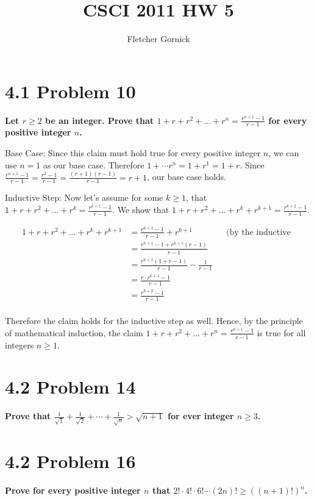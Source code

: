 \documentclass[10pt]{article}
\title{CSCI 2011 HW 5}
\author{Fletcher Gornick}
\def \n {\par \vspace{\baselineskip}}
\begin{document}
\maketitle

\section{4.1 Problem 10}
\textbf{Let $r \geq 2$ be an integer.  Prove that $1 + r + r^2 + ... + r^n = \frac{r^{n+1} - 1}{r - 1}$ for every positive integer $n$.}

\n
Base Case: Since this claim must hold true for every positive integer $n$, we can use $n = 1$ as our base case.  
Therefore $1 + \cdots r^n = 1 + r^1 = 1 + r$.  Since $\frac{r^{n+1} - 1}{r - 1} = \frac{r^2 - 1}{r - 1} = \frac{(r+1)(r-1)}{r-1} = r + 1$,
our base case holds.

\n
Inductive Step: Now let's assume for some $k \geq 1$, that $1 + r + r^2 + ... + r^k = \frac{r^{k+1} - 1}{r - 1}$.  We show that
$1 + r + r^2 + ... + r^k + r^{k+1} = \frac{r^{k+2} - 1}{r - 1}$.

\begin{align*}
    && 1 + r + r^2 + ... + r^k + r^{k+1} &= \frac{r^{k+1} - 1}{r - 1} + r^{k+1} && \text{(by the inductive hypothesis)} \\
    && &= \frac{r^{k+1} - 1 + r^{k+1}(r-1)}{r - 1} \\
    && &= \frac{r^{k+1}(1 + r - 1)}{r - 1} - \frac{1}{r - 1} && \\
    && &= \frac{r \cdot r^{k+1} - 1}{r - 1} && \\
    && &= \frac{r^{k+2} - 1}{r - 1} && \\
\end{align*}

Therefore the claim holds for the inductive step as well.  Hence, by the principle of mathematical induction, the claim 
$1 + r + r^2 + ... + r^n = \frac{r^{n+1} - 1}{r - 1}$ is true for all integers $n \geq 1$.


\section{4.2 Problem 14}
\textbf{Prove that $\frac{1}{\sqrt{1}} + \frac{1}{\sqrt{2}} + \cdots + \frac{1}{\sqrt{n}} > \sqrt{n + 1}$ for ever integer $n \geq 3$.}



\section{4.2 Problem 16}
\textbf{Prove for every positive integer $n$ that $2! \cdot 4! \cdot 6! \cdots (2n)! \geq ((n + 1)!)^n$.}
\end{document}

